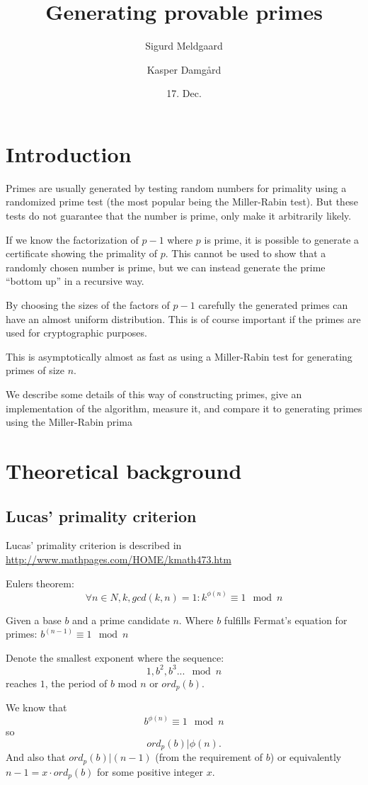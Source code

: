 \documentclass[11pt,a4paper]{article}
\title{Generating provable primes}
\author{Sigurd Meldgaard \and Kasper Damgård}
\date{17. Dec.}
\begin{document}
\maketitle
\section{Introduction}
Primes are usually generated by testing random numbers for primality
using a randomized prime test (the most popular being the Miller-Rabin
test).  But these tests do not guarantee that the number is prime,
only make it arbitrarily likely.

If we know the factorization of $p-1$ where $p$ is prime, it is
possible to generate a certificate showing the primality of $p$. This
cannot be used to show that a randomly chosen number is prime, but we
can instead generate the prime ``bottom up'' in a recursive way.

By choosing the sizes of the factors of $p-1$ carefully the generated
primes can have an almost uniform distribution. This is of course
important if the primes are used for cryptographic purposes.

This is asymptotically almost as fast as using a Miller-Rabin test for
generating primes of size $n$.

We describe some details of this way of constructing primes, give an
implementation of the algorithm, measure it, and compare it to
generating primes using the Miller-Rabin prima
\section{Theoretical background}
\subsection{Lucas' primality criterion}
Lucas' primality criterion is described in \url{http://www.mathpages.com/HOME/kmath473.htm}

Eulers theorem:
\[
\forall n\in N, k, gcd(k,n)=1: k^{\phi(n)} \equiv 1 \mod n
\]

Given a base $b$ and a prime candidate $n$. Where $b$ fulfills Fermat's equation for primes:
$b^{(n-1)}  \equiv  1    \mod n$

Denote the smallest exponent where the sequence:
\[1, b^2, b^3 ... \mod n\]
reaches $1$, the period of $b$ mod $n$ or $ord_p(b)$. 

We know that 
\[b^{\phi(n)} \equiv 1 \mod n\]
 so 
\[ord_p(b)|\phi(n).\] 
And also that \mbox{$ord_p(b)|(n-1)$} (from the requirement of $b$) or
equivalently $n-1 = x\cdot ord_p(b)$ for some positive integer $x$.
\end{document}
